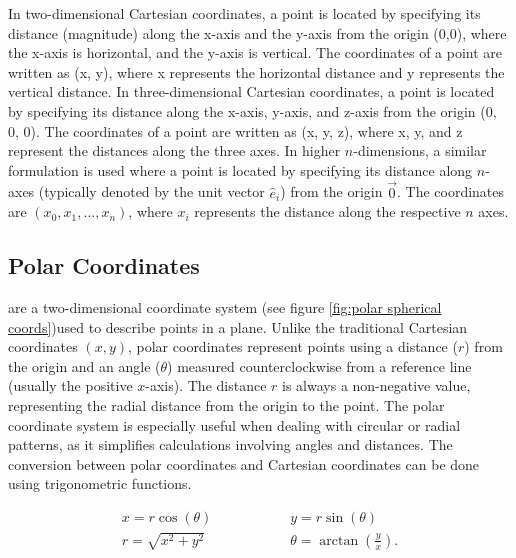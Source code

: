 In two-dimensional Cartesian coordinates, a point is located by specifying its distance (magnitude) along the x-axis and the y-axis from the origin (0,0), where the x-axis is horizontal, and the y-axis is vertical. The coordinates of a point are written as (x, y), where x represents the horizontal distance and y represents the vertical distance. In three-dimensional Cartesian coordinates, a point is located by specifying its distance along the x-axis, y-axis, and z-axis from the origin (0, 0, 0). The coordinates of a point are written as (x, y, z), where x, y, and z represent the distances along the three axes. In higher $n$-dimensions, a similar formulation is used where a point is located by specifying its distance along $n$-axes (typically denoted by the unit vector $\hat{e}_i$) from the origin $\vec{0}$. The coordinates are $(x_0,x_1,...,x_n)$, where $x_i$ represents the distance along the respective $n$ axes.


\subsection{Polar Coordinates \label{section: Polar Coordinates}}

 are a two-dimensional coordinate system  (see figure \ref{fig:polar spherical coords})used to describe points in a plane. Unlike the traditional Cartesian coordinates $(x, y)$, polar coordinates represent points using a distance ($r$) from the origin and an angle ($\theta$) measured counterclockwise from a reference line (usually the positive $x$-axis). The distance $r$ is always a non-negative value, representing the radial distance from the origin to the point. The polar coordinate system is especially useful when dealing with circular or radial patterns, as it simplifies calculations involving angles and distances. The conversion between polar coordinates and Cartesian coordinates can be done using trigonometric functions.

\begin{align}
	x = r\cos(\theta) &\hspace{2cm} y = r\sin(\theta) \\
	 r = \sqrt{x^2 + y^2} &\hspace{2cm} \theta = \arctan\left(\frac{y}{x}\right).
\end{align}


